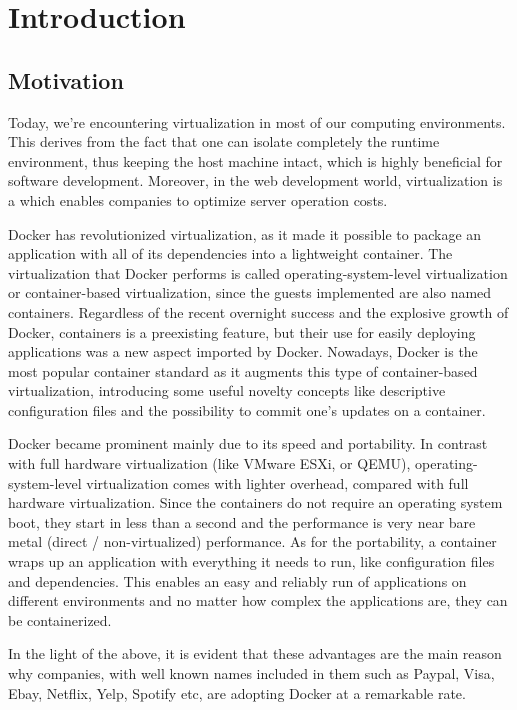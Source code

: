 \chapter{Introduction}

\section{Motivation}

Today, we're encountering virtualization in most of our computing environments. This derives from the fact that one can isolate completely the runtime environment, thus keeping the host machine intact, which is highly beneficial for software development. Moreover, in the web development world, virtualization is a  which enables companies to optimize server operation costs. \cite{virtualdocker}

Docker has revolutionized virtualization, as it made it possible to package an application with all of its dependencies into a lightweight container. The virtualization that Docker performs is called operating-system-level virtualization or container-based virtualization, since the guests implemented are also named containers. Regardless of the recent overnight success and the explosive growth of Docker, containers is a preexisting feature, but their use for easily deploying applications was a new aspect imported by Docker. Nowadays, Docker is the most popular container standard as it augments this type of container-based virtualization, introducing some useful novelty concepts like descriptive configuration files and the possibility to commit one's updates on a container. 

Docker became prominent mainly due to its speed and portability. In contrast with full hardware virtualization (like VMware ESXi, or QEMU), operating-system-level virtualization comes with lighter overhead, compared with full hardware virtualization. Since the containers do not require an operating system boot, they start in less than a second and the performance is very near bare metal (direct / non-virtualized) performance. As for the portability, a container wraps up an application with everything it needs to run, like configuration files and dependencies. This enables an easy and reliably run of applications on different environments and no matter how complex the applications are, they can be containerized.
 
In the light of the above, it is evident that these advantages are the main reason why companies, with well known names included in them such as Paypal, Visa, Ebay, Netflix, Yelp, Spotify etc, are adopting Docker at a remarkable rate.

